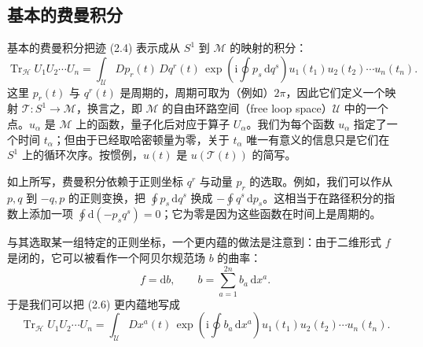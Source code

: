 \documentclass[11pt,a4paper,UTF8]{ctexart}
\theoremstyle{plain}
\theoremstyle{definition}
\begin{document}
\subsection{基本的费曼积分}

基本的费曼积分把迹 (2.4) 表示成从 $S^1$ 到 $\mathcal{M}$ 的映射的积分：
\begin{equation}
    \operatorname{Tr}_{\mathcal{H}}U_1U_2\cdots U_n
    = \int_{\mathcal{U}}Dp_r(t)\,Dq^r(t)\,
    \exp\left(\mathrm{i}\oint p_s\,\mathrm{d}q^s\right)
    u_1(t_1)u_2(t_2)\cdots u_n(t_n).
    \tag{2.6}
\end{equation}
这里 $p_r(t)$ 与 $q^r(t)$ 是周期的，周期可取为（例如）$2\pi$，因此它们定义一个映射 $\mathcal{T}:S^1\to\mathcal{M}$，换言之，即 $\mathcal{M}$ 的自由环路空间（free loop space）$\mathcal{U}$ 中的一个点。$u_\alpha$ 是 $\mathcal{M}$ 上的函数，量子化后对应于算子 $U_\alpha$。我们为每个函数 $u_\alpha$ 指定了一个时间 $t_\alpha$；但由于已经取哈密顿量为零，关于 $t_\alpha$ 唯一有意义的信息只是它们在 $S^1$ 上的循环次序。按惯例，$u(t)$ 是 $u(\mathcal{T}(t))$ 的简写。


如上所写，费曼积分依赖于正则坐标 $q^r$ 与动量 $p_r$ 的选取。例如，我们可以作从 $p,q$ 到 $-q,p$ 的正则变换，把 $\oint p_s\,\mathrm{d}q^s$ 换成 $-\oint q^s\,\mathrm{d}p_s$。这相当于在路径积分的指数上添加一项 $\oint\mathrm{d}(-p_sq^s)=0$；它为零是因为这些函数在时间上是周期的。


与其选取某一组特定的正则坐标，一个更内蕴的做法是注意到：由于二维形式 $f$ 是闭的，它可以被看作一个阿贝尔规范场 $b$ 的曲率：
\begin{equation}
    f = \mathrm{d}b,\qquad b=\sum_{a=1}^{2n}b_a\,\mathrm{d}x^a .
    \tag{2.7}
\end{equation}
于是我们可以把 (2.6) 更内蕴地写成
\begin{equation}
    \operatorname{Tr}_{\mathcal{H}}U_1U_2\cdots U_n
    = \int_{\mathcal{U}}Dx^a(t)\,
    \exp\left(\mathrm{i}\oint b_a\,\mathrm{d}x^a\right)
    u_1(t_1)u_2(t_2)\cdots u_n(t_n).
    \tag{2.8}
\end{equation}
\end{document}
